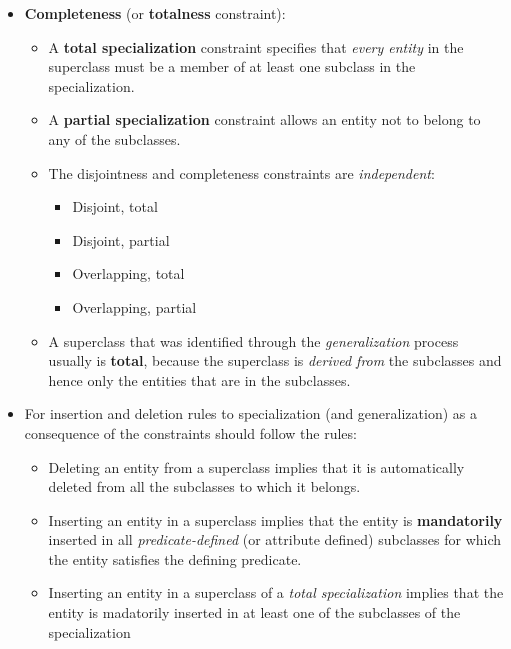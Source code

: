 \documentclass[10pt]{article}
\begin{document}
\begin{enumerate}
\begin{itemize}
		\item \textbf{Completeness} (or \textbf{totalness} constraint):
		\begin{itemize}
			\item A \textbf{total specialization} constraint specifies that \textit{every entity} in the superclass must be a member of at least one subclass in the specialization.
			\item A \textbf{partial specialization} constraint allows an entity not to belong to any of the subclasses.
			\item The disjointness and completeness constraints are \textit{independent}:
			\begin{itemize}
				\item Disjoint, total
				\item Disjoint, partial
				\item Overlapping, total
				\item Overlapping, partial
			\end{itemize}

			\item A superclass that was identified through the \textit{generalization} process usually is \textbf{total}, because the superclass is \textit{derived from} the subclasses and hence only the entities that are in the subclasses.
		\end{itemize}

		\item For insertion and deletion rules to specialization (and generalization) as a consequence of the constraints should follow the rules:
		\begin{itemize}
			\item Deleting an entity from a superclass implies that it is automatically deleted from all the subclasses to which it belongs.
			\item Inserting an entity in a superclass implies that the entity is \textbf{mandatorily} inserted in all \textit{predicate-defined} (or attribute defined) subclasses for which the entity satisfies the defining predicate.
			\item Inserting an entity in a superclass of a \textit{total specialization} implies that the entity is madatorily inserted in at least one of the subclasses of the specialization
		\end{itemize}
	\end{itemize}
\end{enumerate}
\end{document}
